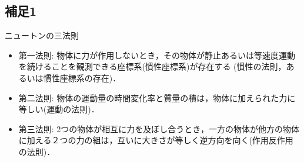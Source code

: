 \documentclass[10pt,a4j]{jarticle}
\begin{document}
\subsection{補足1}
ニュートンの三法則
\begin{itemize}
\item
第一法則:
物体に力が作用しないとき，その物体が静止あるいは等速度運動を続けることを観測できる座標系(慣性座標系)が存在する
		(慣性の法則，あるいは慣性座標系の存在)．
\item
第二法則:
物体の運動量の時間変化率と質量の積は，物体に加えられた力に等しい(運動の法則)．
\item
第三法則:
2つの物体が相互に力を及ぼし合うとき，一方の物体が他方の物体に加える２つの力の組は，互いに大きさが等しく逆方向を向く(作用反作用の法則)．
\end{itemize}
\end{document}
